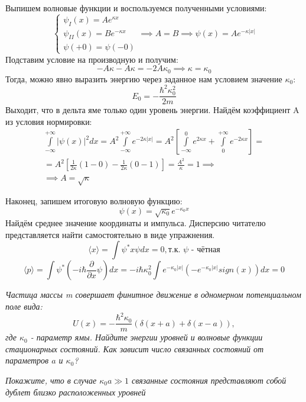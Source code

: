 Выпишем волновые функции и воспользуемся полученными условиями:
\[
\begin{cases}
    \psi_I(x) = Ae^{\kappa x}\\
    \psi_{II}(x) = Be^{-\kappa x}\\
    \psi(+0) = \psi(-0)
\end{cases}
\implies A = B \implies \psi(x) = Ae^{-\kappa|x|}
\]
Подставим условие на производную и получим:
\[
-A\kappa - A\kappa = -2A\kappa_0 \implies \kappa = \kappa_0 
\]
Тогда, можно явно выразить энергию через заданное нам условием значение $\kappa_0$:
\[
E_0 = - \frac{\hbar^2 \kappa_0^2}{2m}
\]
Выходит, что в дельта яме только один уровень энергии. Найдём коэффициент A из условия нормировки:
\begin{gather*}
\int\limits_{-\infty}^{+\infty} |\psi(x)|^2 dx = A^2\int\limits_{-\infty}^{+\infty} e^{-2\kappa |x|} = A^2\left[\int\limits_{-\infty}^0 e^{2\kappa x} + \int\limits_0^{+\infty} e^{-2\kappa x}\right] =\\
= A^2\left[ \frac{1}{2\kappa}(1 - 0) - \frac{1}{2\kappa}(0-1)\right] = \frac{A^2}{\kappa} = 1 \implies  \\ \implies  A = \sqrt{\kappa}
\end{gather*}


Наконец, запишем итоговую волновую функцию:
\[
\psi(x) = \sqrt{\kappa_0}e^{-\kappa_0 x}
\]
Найдём среднее значение координаты и импульса. Дисперсию читателю представляется найти самостоятельно в виде упражнения.
\[
\langle x \rangle = \int\psi^*x\psi dx = 0, \text{т.к. $\psi$ - чётная}
\]
\[
\langle p \rangle = \int\psi^*(-i\hbar\frac{\partial}{\partial x}\psi) dx = -i\hbar\kappa_0^2\int e^{-\kappa_0|x|}(-e^{-\kappa_0|x|}sign(x)) dx = 0
\]
\begin{center}
    \textit{Частица массы m совершает финитное движение в одномерном потенциальном поле вида:}
    \[
    U(x) = -\frac{\hbar^2\kappa_0}{m}(\delta(x+a) + \delta(x-a)),
    \]
    \textit{где $\kappa_0$ - параметр ямы. Найдите энергии уровней и волновые функции стационарных состояний. Как зависит число связанных состояний от параметров $a$ и $\kappa_0$?}
    
    \textit{Покажите, что в случае $\kappa_0a \gg 1$ связанные состояния представляют собой дублет близко расположенных уровней}
\end{center}

